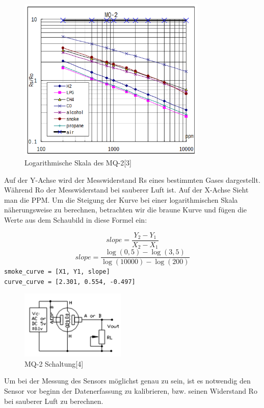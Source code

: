 \documentclass[a4paper, 11pt]{article}
\begin{document}
\begin{figure}[h]
    \begin{center}
        \includegraphics[width=9cm]{mq2_log.png}
    \caption{Logarithmische Skala des MQ-2[3]}
    \end{center}
\end{figure}

Auf der Y-Achse wird der Messwiderstand Rs eines bestimmten Gases dargestellt.
Während Ro der Messwiderstand bei sauberer Luft ist. Auf der X-Achse Sieht man
die PPM.
\newpage
Um die Steigung der Kurve bei einer logarithmischen Skala näherungsweise zu
berechnen, betrachten wir die braune Kurve und fügen die Werte aus dem
Schaubild in diese Formel ein:

$$
slope = \frac{Y_{2}-Y_{1}}{X_{2}-X_{1}}
$$
$$
slope = \frac{\log(0,5)-\log(3,5)}{\log(10000)-\log(200)}
$$
\texttt{smoke\_curve = [X1, Y1, slope]}\\
\texttt{curve\_curve = [2.301, 0.554, -0.497]}

\begin{figure}[h]
    \begin{center}
        \includegraphics[width=5cm]{mq2_schem.png}
    \caption{MQ-2 Schaltung[4]}
    \end{center}
\end{figure}

Um bei der Messung des Sensors möglichst genau zu sein, ist es notwendig den
Sensor vor beginn der Datenerfassung zu kalibrieren, bzw. seinen Widerstand Ro 
bei sauberer Luft zu berechnen. 
\end{document}
